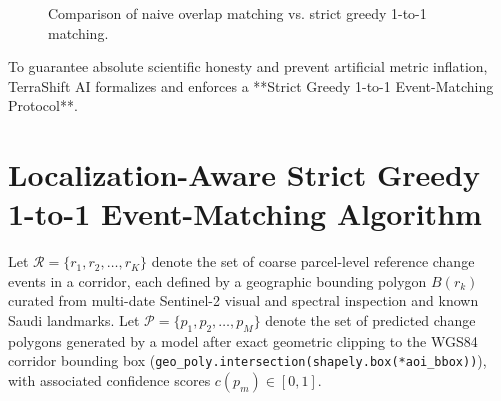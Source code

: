 \begin{figure}[htbp]
\centering
{}
\caption{Comparison of naive overlap matching vs. strict greedy 1-to-1 matching.}
\label{fig:fragmentation_artifact}
\end{figure}

To guarantee absolute scientific honesty and prevent artificial metric inflation, TerraShift AI formalizes and enforces a **Strict Greedy 1-to-1 Event-Matching Protocol**.

\section{Localization-Aware Strict Greedy 1-to-1 Event-Matching Algorithm}
\label{sec:exp_greedy_matching}
Let $\mathcal{R} = \{r_1, r_2, \dots, r_K\}$ denote the set of coarse parcel-level reference change events in a corridor, each defined by a geographic bounding polygon $B(r_k)$ curated from multi-date Sentinel-2 visual and spectral inspection and known Saudi landmarks. Let $\mathcal{P} = \{p_1, p_2, \dots, p_M\}$ denote the set of predicted change polygons generated by a model after exact geometric clipping to the WGS84 corridor bounding box (\texttt{geo\_poly.intersection(shapely.box(*aoi\_bbox))}), with associated confidence scores $c(p_m) \in [0, 1]$.

